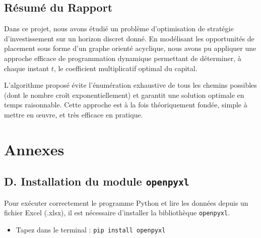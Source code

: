 \documentclass[a4paper,11pt]{article}
\begin{document}
\subsection*{Résumé du Rapport}

Dans ce projet, nous avons étudié un problème d’optimisation de stratégie d’investissement sur un horizon discret donné.  
En modélisant les opportunités de placement sous forme d’un graphe orienté acyclique, nous avons pu appliquer une approche efficace de programmation dynamique permettant de déterminer, à chaque instant $t$, le coefficient multiplicatif optimal du capital.

L’algorithme proposé évite l’énumération exhaustive de tous les chemins possibles (dont le nombre croît exponentiellement) et garantit une solution optimale en temps raisonnable.  
Cette approche est à la fois théoriquement fondée, simple à mettre en œuvre, et très efficace en pratique.


\section*{Annexes}

\subsection*{D. Installation du module \texttt{openpyxl}}

Pour exécuter correctement le programme Python et lire les données depuis un fichier Excel (.xlsx), il est nécessaire d’installer la bibliothèque \texttt{openpyxl}.

\begin{itemize}
	\item Tapez dans le terminal : \texttt{pip install openpyxl}
\end{itemize}
\end{document}
